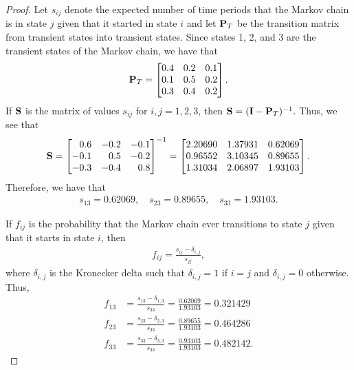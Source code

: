 \begin{proof}
  Let $s_{ij}$ denote the expected number of time periods that the Markov chain is in
  state $j$ given that it started in state $i$ and let $\bold{P}_T$ be the transition matrix
  from transient states into transient states. Since states 1, 2, and 3 are the transient states of the Markov
  chain, we have that
  \begin{align*}
    \bold{P}_T =
    \begin{bmatrix}
      0.4 & 0.2 & 0.1  \\
      0.1 & 0.5 & 0.2  \\
      0.3 & 0.4 & 0.2
    \end{bmatrix}.
  \end{align*}
  If $\bold{S}$ is the matrix of values $s_{ij}$ for $i,j = 1, 2, 3$, then $\bold{S} = (\bold{I} - \bold{P}_T)^{-1}.$
  Thus, we see that
  \begin{align*}
    \bold{S} =
    \begin{bmatrix}
       \phantom{-}0.6 & -0.2 & -0.1 \\
      -0.1 &  \phantom{-}0.5 & -0.2 \\
      -0.3 & -0.4 &  \phantom{-}0.8 \\
    \end{bmatrix}^{-1} =
    \begin{bmatrix}
      2.20690 & 1.37931 & 0.62069 \\
      0.96552 & 3.10345 & 0.89655 \\
      1.31034 & 2.06897 & 1.93103 \\
    \end{bmatrix}.
  \end{align*}
  Therefore, we have that
  \begin{align*}
    s_{13} = 0.62069,\quad
    s_{23} = 0.89655,\quad
    s_{33} = 1.93103.
  \end{align*}

  If $f_{ij}$ is the probability that the Markov chain ever transitions to state $j$ given that it starts
  in state $i$, then
  \begin{align*}
    f_{ij} = \frac{s_{ij} - \delta_{i,j}}{s_{jj}},
  \end{align*}
  where $\delta_{i,j}$ is the Kronecker delta such that $\delta_{i,j} =1$ if $i=j$ and $\delta_{i,j} =0$ otherwise. Thus,
  \begin{align*}
    f_{13} &= \frac{s_{13} - \delta_{1,3}}{s_{33}} =  \frac{0.62069}{1.93103} = 0.321429\\
    f_{23} &= \frac{s_{23} - \delta_{2,3}}{s_{33}} =  \frac{0.89655}{1.93103} = 0.464286\\
    f_{33} &= \frac{s_{33} - \delta_{3,3}}{s_{33}} =  \frac{0.93103}{1.93103} = 0.482142.
  \end{align*}
\end{proof}
\newpage
